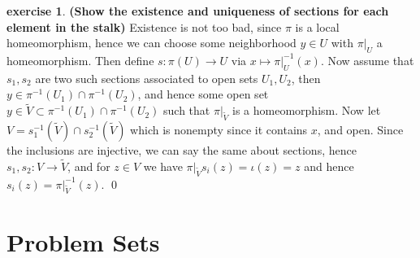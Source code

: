 \documentclass[10.5pt]{article}
\theoremstyle{definition}
\newtheorem{exe}{exercise}
\begin{document}
    \begin{exe}\label{Existence and uniqueness sections on stalks}
        \textbf{(Show the existence and uniqueness of sections for each element in the stalk)}
        Existence is not too bad, since \(\pi\) is a local homeomorphism, hence we can choose some neighborhood \(y \in U\) with \(\pi\vert_U\) a homeomorphism. Then define \(s: \pi(U) \to U\) via \(x \mapsto \pi\vert_U^{-1}(x)\). Now assume that \(s_1,s_2\) are two such sections associated to open sets \(U_1,U_2\), then \(y \in \pi^{-1}(U_1) \cap \pi^{-1}(U_2)\), and hence some open set \(y \in \tilde{V} \subset \pi^{-1}(U_1) \cap \pi^{-1}(U_2)\) such that \(\pi\vert_{\tilde{V}}\) is a homeomorphism. Now let \(V = s_1^{-1}(\tilde{V}) \cap s_2^{-1}(\tilde{V})\) which is nonempty since it contains \(x\), and open. Since the inclusions are injective, we can say the same about sections, hence \(s_1,s_2:  V \to \tilde{V}\), and for \(z \in V\) we have \(\pi\vert_{\tilde{V}}s_i(z) = \iota(z) = z\) and hence \(s_i(z) = \pi\vert_{\tilde{V}}^{-1}(z)\). \qed
    \end{exe}
    


    \appendix

    \section{Problem Sets}
\end{document}
